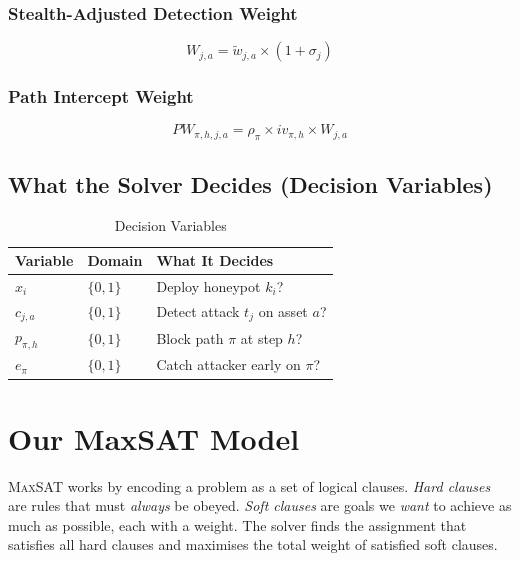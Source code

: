 \documentclass[journal]{IEEEtran}
\newcommand{\maxsat}{\textsc{MaxSAT}}
\newcommand{\tildeW}{\tilde{w}}
\begin{document}
\subsubsection{Stealth-Adjusted Detection Weight}
\begin{equation}
  W_{j,a} = \tildeW_{j,a} \times (1 + \sigma_j)
\end{equation}

\subsubsection{Path Intercept Weight}
\begin{equation}
  PW_{\pi,h,j,a} = \rho_\pi \times iv_{\pi,h} \times W_{j,a}
\end{equation}

\subsection{What the Solver Decides (Decision Variables)}

\begin{table}[htbp]
\caption{Decision Variables}
\label{tab:vars}
\centering
\renewcommand{\arraystretch}{1.2}
\begin{tabular}{@{}lll@{}}
\toprule
\textbf{Variable} & \textbf{Domain} & \textbf{What It Decides} \\
\midrule
$x_i$      & $\{0,1\}$ & Deploy honeypot $k_i$? \\
$c_{j,a}$  & $\{0,1\}$ & Detect attack $t_j$ on asset $a$? \\
$p_{\pi,h}$& $\{0,1\}$ & Block path $\pi$ at step $h$? \\
$e_\pi$    & $\{0,1\}$ & Catch attacker early on $\pi$? \\
\bottomrule
\end{tabular}
\end{table}

\section{Our MaxSAT Model}
\label{sec:formulation}

\maxsat{} works by encoding a problem as a set of logical
clauses.
\emph{Hard clauses} are rules that must \emph{always} be
obeyed.
\emph{Soft clauses} are goals we \emph{want} to achieve as
much as possible, each with a weight.
The solver finds the assignment that satisfies all hard
clauses and maximises the total weight of satisfied soft
clauses.
\end{document}

